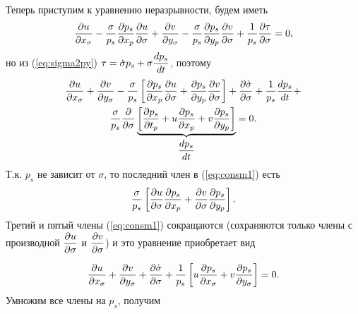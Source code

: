 Теперь приступим к уравнению неразрывности, будем иметь
\begin{equation*}
    \displaystyle\frac{\partial u}{\partial x_{\sigma}}-\frac{\sigma}{p_s}\displaystyle\frac{\partial p_s}{\partial x_p}\displaystyle\frac{\partial u}{\partial \sigma}+\displaystyle\frac{\partial v}{\partial y_{\sigma}}-\frac{\sigma}{p_s}\displaystyle\frac{\partial p_s}{\partial y_p}\displaystyle\frac{\partial v}{\partial \sigma}+\frac{1}{p_s}\displaystyle\frac{\partial \tau}{\partial \sigma}=0,
\end{equation*}
но из (\ref{eq:sigma2py}) $\tau=\dot{\sigma}p_s+\sigma\displaystyle\frac{d p_s}{d t}$, поэтому
\begin{multline}
    \label{eq:consm1}
    \pd{u}{x_{\sigma}}+\pd{v}{y_{\sigma}}-
    \frac{\sigma}{p_s} \left[ \pd{p_s}{x_p} \pd{u}{\sigma}+\pd{p_s}{y_p}\pd{v}{\sigma}  \right] + \pd{\dot{\sigma}}{\sigma}+\frac{1}{p_s}\td{p_s}{t}+\\
    \frac{\sigma}{p_s}\pd{}{\sigma} \underbrace{\left[ \pd{p_s}{t_p} + u\pd{p_s}{x_p}+v\pd{p_s}{y_p} \right]}_{\td{p_s}{t}} = 0.
\end{multline}
Т.к. $p_s$ не зависит от $\sigma$, то последний член в (\ref{eq:consm1}) есть 
\begin{equation*}
    \frac{\sigma}{p_s} \left[ \displaystyle\frac{\partial u}{\partial \sigma}\displaystyle\frac{\partial p_s}{\partial x_p} + \displaystyle\frac{\partial v}{\partial \sigma}\displaystyle\frac{\partial p_s}{\partial y_p}  \right].
\end{equation*}
Третий и пятый члены (\ref{eq:consm1}) сокращаются (сохраняются только члены с производной $\displaystyle\frac{\partial u}{\partial \sigma}$ и $ \displaystyle\frac{\partial v}{\partial \sigma}$) и это уравнение приобретает вид

\begin{equation*}
    \displaystyle\frac{\partial u}{\partial x_{\sigma}} + \displaystyle\frac{\partial v}{\partial y_{\sigma}} + \displaystyle\frac{\partial  \dot{\sigma} }{\partial \sigma} + \frac{1}{p_s} \left[ u\displaystyle\frac{\partial p_s}{\partial x_{\sigma}} + v\displaystyle\frac{\partial p_s}{\partial y_{\sigma}} \right] = 0.
\end{equation*}
Умножим все члены на $p_s$, получим

